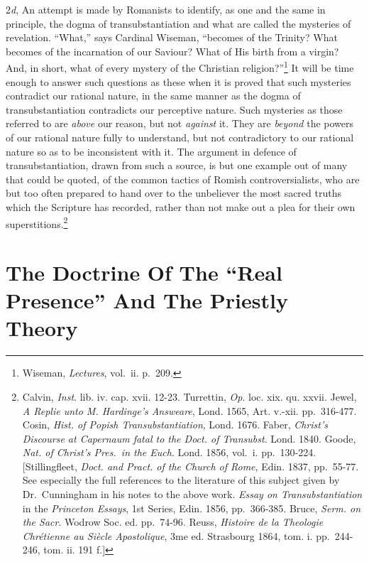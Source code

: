 \documentclass[english,]{book}
\begin{document}
2\emph{d}, An attempt is made by Romanists to identify, as one and the same in principle, the dogma of transubstantiation and what are called the mysteries of revelation. ``What,'' says Cardinal Wiseman, ``becomes of the Trinity? What becomes of the incarnation of our Saviour? What of His birth from a virgin? And, in short, what of every mystery of the Christian religion?''\footnote{Wiseman, \emph{Lectures}, vol.~ii. p.~209.} It will be time enough to answer such questions as these when it is proved that such mysteries contradict our rational nature, in the same manner as the dogma of transubstantiation contradicts our perceptive nature. Such mysteries as those referred to are \emph{above} our reason, but not \emph{against} it. They are \emph{beyond} the powers of our rational nature fully to understand, but not contradictory to our rational nature so as to be inconsistent with it. The argument in defence of transubstantiation, drawn from such a source, is but one example out of many that could be quoted, of the common tactics of Romish controversialists, who are but too often prepared to hand over to the unbeliever the most sacred truths which the Scripture has recorded, rather than not make out a plea for their own superstitions.\footnote{Calvin, \emph{Inst}. lib. iv. cap. xvii. 12-23. Turrettin, \emph{Op}. loc. xix. qu. xxvii. Jewel, \emph{A Replie unto M. Hardinge's Answeare}, Lond. 1565, Art. v.-xii. pp.~316-477. Cosin, \emph{Hist. of Popish Transubstantiation}, Lond. 1676. Faber, \emph{Christ's Discourse at Capernaum fatal to the Doct. of Transubst}. Lond. 1840. Goode, \emph{Nat. of Christ's Pres.~in the Euch}. Lond. 1856, vol.~i. pp.~130-224. {[}Stillingfleet, \emph{Doct. and Pract. of the Church of Rome}, Edin. 1837, pp.~55-77. See especially the full references to the literature of this subject given by Dr.~Cunningham in his notes to the above work. \emph{Essay on Transubstantiation} in the \emph{Princeton Essays}, 1st Series, Edin. 1856, pp.~366-385. Bruce, \emph{Serm. on the Sacr}. Wodrow Soc. ed. pp.~74-96. Reuss, \emph{Histoire de la Theologie Chrétienne au Siècle Apostolique}, 3me ed. Strasbourg 1864, tom. i. pp.~244-246, tom. ii. 191 f.{]}}

\hypertarget{the-doctrine-of-the-real-presence-and-the-priestly-theory}{%
\section{The Doctrine Of The ``Real Presence'' And The Priestly Theory}\label{the-doctrine-of-the-real-presence-and-the-priestly-theory}}
\end{document}
